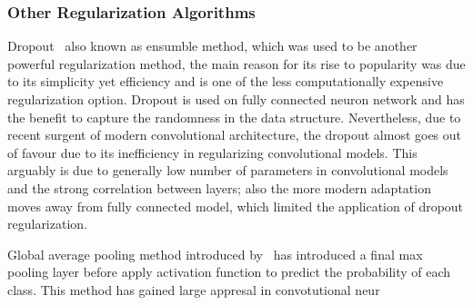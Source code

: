 \subsubsection{Other Regularization Algorithms}

Dropout~\cite{JMLR:v15:srivastava14a} also known as ensumble method, which was used to be another powerful regularization method, the main reason for its rise to popularity was due to its simplicity yet efficiency and is one of the less computationally expensive regularization option. Dropout is used on fully connected neuron network and has the benefit to capture the randomness in the data structure. Nevertheless, due to recent surgent of modern convolutional architecture, the dropout almost goes out of favour due to its inefficiency in regularizing convolutional models. This arguably is due to generally low number of parameters in convolutional models and the strong correlation between layers; also the more modern adaptation moves away from fully connected model, which limited the application of dropout regularization. 
\par 
Global average pooling method introduced by~\citet{LinCY13} has introduced a final max pooling layer before apply activation function to predict the probability of each class. This method has gained large appresal in convotutional neur